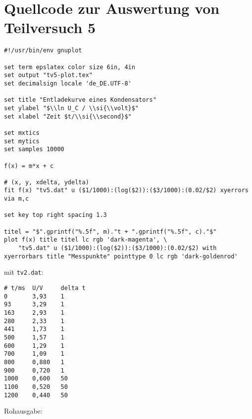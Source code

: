 \section{\gnuplot{} Quellcode zur Auswertung von Teilversuch 5}
    \label{appdx:gnuplottv5}
    {  
        \renewcommand{\fcolorbox}[4][]{#4}
        \begin{verbatim}
#!/usr/bin/env gnuplot

set term epslatex color size 6in, 4in
set output "tv5-plot.tex"
set decimalsign locale 'de_DE.UTF-8'

set title "Entladekurve eines Kondensators"
set ylabel "$\\ln U_C / \\si{\\volt}$"
set xlabel "Zeit $t/\\si{\\second}$"

set mxtics
set mytics
set samples 10000

f(x) = m*x + c

# (x, y, xdelta, ydelta)
fit f(x) "tv5.dat" u ($1/1000):(log($2)):($3/1000):(0.02/$2) xyerrors via m,c

set key top right spacing 1.3

titel = "$".gprintf("%.5f", m)."t + ".gprintf("%.5f", c)."$"
plot f(x) title titel lc rgb 'dark-magenta', \
    "tv5.dat" u ($1/1000):(log($2)):($3/1000):(0.02/$2) with xyerrorbars title "Messpunkte" pointtype 0 lc rgb 'dark-goldenrod'
        \end{verbatim}
    }
    mit \texttt{tv2.dat}:
    \begin{multicols}{2}
        \begin{verbatim}
# t/ms  U/V     delta t
0       3,93    1
93      3,29    1
163     2,93    1
280     2,33    1
441     1,73    1
500     1,57    1
600     1,29    1
700     1,09    1
800     0,880   1
900     0,720   1
1000    0,600   50
1100    0,520   50
1200    0,440   50
        \end{verbatim}
    \end{multicols}
    \vspace{-\baselineskip}
    Rohausgabe:
